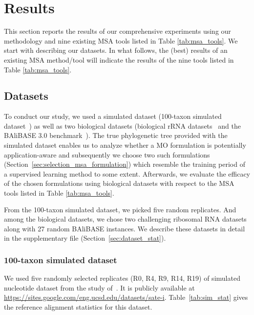  \section{Results}
\label{sec:results}
This section reports the results of our comprehensive experiments using our methodology and nine existing MSA tools listed in Table \ref{tab:msa_tools}. We start with describing our datasets. In what follows, the (best) results  of an existing MSA method/tool will indicate the results of the nine tools listed in Table \ref{tab:msa_tools}.


\subsection{Datasets}
To conduct our study, we used a simulated dataset (100-taxon simulated dataset~\citep{liu2009rapid}) as well as two biological datasets (biological rRNA datasets~\citep{liu2009rapid} and the BAliBASE 3.0 benchmark~\citep{thompson2005balibase}). The true phylogenetic tree provided with the simulated dataset enables us to analyze whether a MO formulation is potentially application-aware and subsequently we choose two such formulations (Section~\ref{sec:selection_msa_formulation}) which resemble the training period of a supervised learning method to some extent. Afterwards, we evaluate the efficacy of the chosen formulations using biological datasets with respect to the MSA tools listed in Table \ref{tab:msa_tools}.  


From the 100-taxon simulated dataset, we picked five random replicates. And among the biological datasets, we chose two challenging ribosomal RNA datasets along with 27 random BAliBASE instances. We describe these datasets in detail in the supplementary file (Section~\ref{sec:dataset_stat}). 

\subsubsection{100-taxon simulated dataset}
We used five randomly selected replicates (R0, R4, R9, R14, R19) of simulated nucleotide dataset from the study of~\citealp{liu2009rapid}. It is publicly available at \url{https://sites.google.com/eng.ucsd.edu/datasets/sate-i}. Table~\ref{tab:sim_stat} gives the reference alignment statistics for this dataset.

